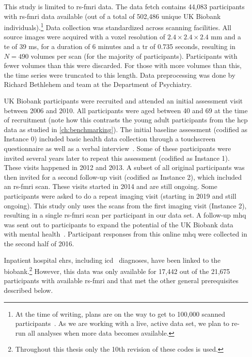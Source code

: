 This study is limited to \gls{rs-fmri} data.
The data fetch contains 44,083 participants with \gls{rs-fmri} data available (out of a total of 502,486 unique UK Biobank individuals).\footnote{At the time of writing, plans are on the way to get to 100,000 scanned participants~\parencite{Littlejohns2020}. As we are working with a live, active data set, we plan to re-run all analyses when more data becomes available.}
Data collection was standardized across scanning facilities.
All source images were acquired with a voxel resolution of $2.4 \times 2.4 \times 2.4$ mm and a \gls{te} of 39 ms, for a duration of 6 minutes and a \gls{tr} of 0.735 seconds, resulting in $N = 490$ volumes per scan (for the majority of participants).
Participants with fewer volumes than this were discarded.
For those with more volumes than this, the time series were truncated to this length.
Data preprocessing was done by Richard Bethlehem and team at the Department of Psychiatry.

UK Biobank participants were recruited and attended an initial assessment visit between 2006 and 2010.
All participants were aged between 40 and 69 at the time of recruitment (note how this contrasts the young adult participants from the \gls{hcp} data as studied in \cref{ch:benchmarking}).
The initial baseline assessment (codified as Instance 0) included basic health data collection through a touchscreen questionnaire as well as a verbal interview~\parencite{Bycroft2018}.
%
Some of these participants were invited several years later to repeat this assessment (codified as Instance 1).
These visits happened in 2012 and 2013.
%
A subset of all original participants was then invited for a second follow-up visit (codified as Instance 2), which included an \gls{rs-fmri} scan.
These visits started in 2014 and are still ongoing.
%
Some participants were asked to do a repeat imaging visit (starting in 2019 and still ongoing).
%
This study only uses the scans from the first imaging visit (Instance 2), resulting in a single \gls{rs-fmri} scan per participant in our data set.
A follow-up \gls{mhq} was sent out to participants to expand the potential of the UK Biobank data with mental health~\parencite{Davis2020, Glanville2021}.
Participant responses from this online \gls{mhq} were collected in the second half of 2016.

Inpatient hospital \glspl{ehr}, including \gls{icd}~\parencite{WHO1992} diagnoses, have been linked to the biobank.\footnote{Throughout this thesis only the 10th revision of these codes is used.}
However, this data was only available for 17,442 out of the 21,675 participants with available \gls{rs-fmri} and that met the other general prerequisites described below.

